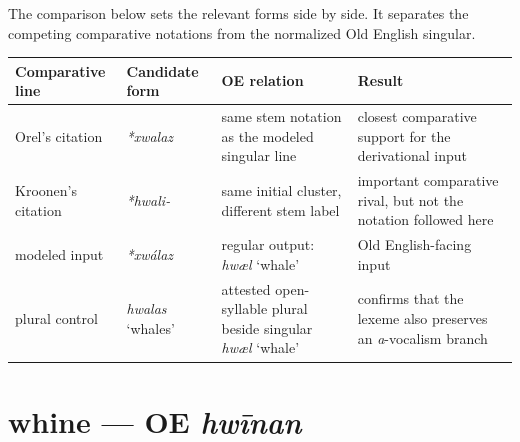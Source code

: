 \documentclass[
  british,
  a4paper,
  openany]{book}
\newcounter{none} %
\providecommand{\texorpdfstring}[2]{#1}
\begin{document}
The comparison below sets the relevant forms side by side. It separates
the competing comparative notations from the normalized Old English
singular.

{\def\LTcaptype{none} %
\begin{longtable}[]{@{}
  >{\raggedright\arraybackslash}p{}
  >{\raggedright\arraybackslash}p{}
  >{\raggedright\arraybackslash}p{}
  >{\raggedright\arraybackslash}p{}@{}}
\toprule\noalign{}
\begin{minipage}[b]{\linewidth}\raggedright
Comparative line
\end{minipage} & \begin{minipage}[b]{\linewidth}\raggedright
Candidate form
\end{minipage} & \begin{minipage}[b]{\linewidth}\raggedright
OE relation
\end{minipage} & \begin{minipage}[b]{\linewidth}\raggedright
Result
\end{minipage} \\
\midrule\noalign{}
\endhead
\bottomrule\noalign{}
\endlastfoot
Orel's citation & {\emph{*xwalaz}} & same stem notation as the modeled
singular line & closest comparative support for the derivational
input \\
Kroonen's citation & {\emph{*hwali-}} & same initial cluster, different
stem label & important comparative rival, but not the notation followed
here \\
modeled input & {\emph{*xwálaz}} & regular output: {\emph{hwæl}} `whale'
& Old English-facing input \\
plural control & {\emph{hwalas}} `whales' & attested open-syllable
plural beside singular {\emph{hwæl}} `whale' & confirms that the lexeme
also preserves an \emph{a}-vocalism branch \\
\end{longtable}
}

\section{\texorpdfstring{whine --- OE
\emph{hwīnan}}{whine --- OE hwīnan}}\label{whine-oe-hwux12bnan}

\end{document}
